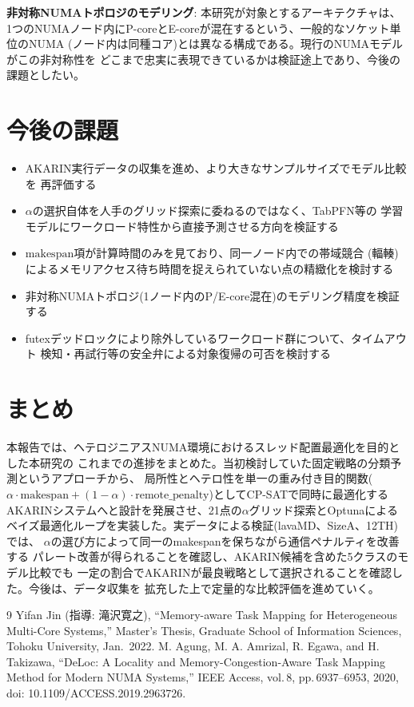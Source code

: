 \documentclass[a4paper]{article}
\begin{document}
\textbf{非対称NUMAトポロジのモデリング}: 本研究が対象とするアーキテクチャは、
1つのNUMAノード内にP-coreとE-coreが混在するという、一般的なソケット単位のNUMA
(ノード内は同種コア)とは異なる構成である。現行のNUMAモデルがこの非対称性を
どこまで忠実に表現できているかは検証途上であり、今後の課題としたい。

\section{今後の課題}
\begin{itemize}
  \item AKARIN実行データの収集を進め、より大きなサンプルサイズでモデル比較を
    再評価する
  \item $\alpha$の選択自体を人手のグリッド探索に委ねるのではなく、TabPFN等の
    学習モデルにワークロード特性から直接予測させる方向を検証する
  \item $\mathrm{makespan}$項が計算時間のみを見ており、同一ノード内での帯域競合
    (輻輳)によるメモリアクセス待ち時間を捉えられていない点の精緻化を検討する
  \item 非対称NUMAトポロジ(1ノード内のP/E-core混在)のモデリング精度を検証する
  \item futexデッドロックにより除外しているワークロード群について、タイムアウト
    検知・再試行等の安全弁による対象復帰の可否を検討する
\end{itemize}

\section{まとめ}
本報告では、ヘテロジニアスNUMA環境におけるスレッド配置最適化を目的とした本研究の
これまでの進捗をまとめた。当初検討していた固定戦略の分類予測というアプローチから、
局所性とヘテロ性を単一の重み付き目的関数($\alpha \cdot \mathrm{makespan} +
(1-\alpha) \cdot \mathrm{remote\_penalty}$)としてCP-SATで同時に最適化する
AKARINシステムへと設計を発展させ、21点の$\alpha$グリッド探索とOptunaによる
ベイズ最適化ループを実装した。実データによる検証(lavaMD、SizeA、12TH)では、
$\alpha$の選び方によって同一のmakespanを保ちながら通信ペナルティを改善する
パレート改善が得られることを確認し、AKARIN候補を含めた5クラスのモデル比較でも
一定の割合でAKARINが最良戦略として選択されることを確認した。今後は、データ収集を
拡充した上で定量的な比較評価を進めていく。

\begin{thebibliography}{9}
 Yifan Jin (指導: 滝沢寛之), ``Memory-aware Task Mapping for
  Heterogeneous Multi-Core Systems,'' Master's Thesis, Graduate School of
  Information Sciences, Tohoku University, Jan.\ 2022.
 M. Agung, M. A. Amrizal, R. Egawa, and H. Takizawa,
  ``DeLoc: A Locality and Memory-Congestion-Aware Task Mapping Method for
  Modern NUMA Systems,'' IEEE Access, vol.\,8, pp.\,6937--6953, 2020,
  doi: 10.1109/ACCESS.2019.2963726.
\end{thebibliography}
\end{document}
